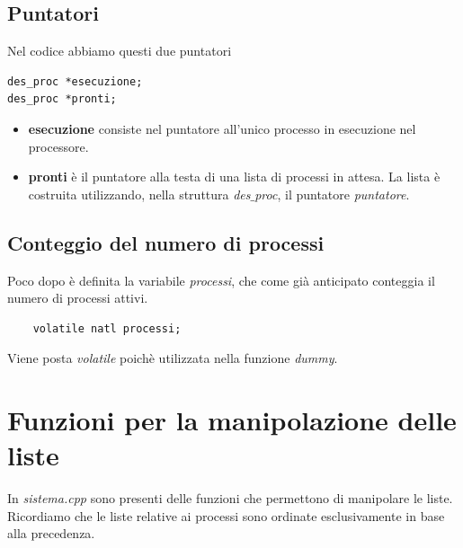 \documentclass[11pt]{report}
\theoremstyle{definition}
\begin{document}
\subsection{Puntatori}
Nel codice abbiamo questi due puntatori
\begin{verbatim}
des_proc *esecuzione; 
des_proc *pronti;
\end{verbatim}
\begin{itemize}
	\item \textbf{esecuzione} consiste nel puntatore all'unico processo in esecuzione nel processore.
	\item \textbf{pronti} è il puntatore alla testa di una lista di processi in attesa. La lista è costruita utilizzando, nella struttura \emph{des$\_$proc}, il puntatore \emph{puntatore}.
\end{itemize}

\subsection{Conteggio del numero di processi}
Poco dopo è definita la variabile \emph{processi}, che come già anticipato conteggia il numero di processi attivi.
\begin{verbatim}
	volatile natl processi;
\end{verbatim}
Viene posta \emph{volatile} poichè utilizzata nella funzione \emph{dummy}.

\section{Funzioni per la manipolazione delle liste}
In \emph{sistema.cpp} sono presenti delle funzioni che permettono di manipolare le liste. Ricordiamo che le liste relative ai processi sono ordinate esclusivamente in base alla precedenza. 
\end{document}
